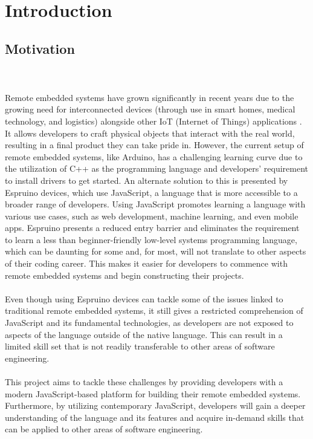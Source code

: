 \documentclass{l4proj}
\begin{document}
\educationalconsent

\tableofcontents
\listoffigures

\chapter{Introduction}



\section{Motivation}

\text 
\\ \\
Remote embedded systems have grown significantly in recent years due to the growing need for interconnected devices (through use in smart homes, medical technology, and logistics) alongside other IoT (Internet of Things) applications \cite{embedded-boom}. It allows developers to craft physical objects that interact with the real world, resulting in a final product they can take pride in. However, the current setup of remote embedded systems, like Arduino, has a challenging learning curve due to the utilization of C++ as the programming language and developers' requirement to install drivers to get started.
An alternate solution to this is presented by Espruino devices, which use JavaScript, a language that is more accessible to a broader range of developers. Using JavaScript promotes learning a language with various use cases, such as web development, machine learning, and even mobile apps. Espruino presents a reduced entry barrier and eliminates the requirement to learn a less than beginner-friendly low-level systems programming language, which can be daunting for some and, for most, will not translate to other aspects of their coding career. This makes it easier for developers to commence with remote embedded systems and begin constructing their projects.
\\ \\
Even though using Espruino devices can tackle some of the issues linked to traditional remote embedded systems, it still gives a restricted comprehension of JavaScript and its fundamental technologies, as developers are not exposed to aspects of the language outside of the native language. This can result in a limited skill set that is not readily transferable to other areas of software engineering.
\\ \\
This project aims to tackle these challenges by providing developers with a modern JavaScript-based platform for building their remote embedded systems. Furthermore, by utilizing contemporary JavaScript, developers will gain a deeper understanding of the language and its features and acquire in-demand skills that can be applied to other areas of software engineering.
\end{document}
